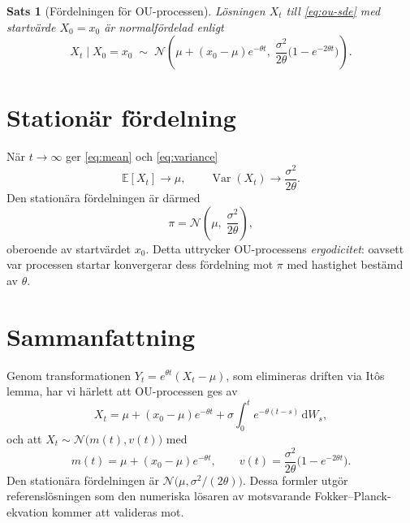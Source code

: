 \documentclass[11pt,a4paper]{article}
\newcommand{\E}{\mathbb{E}}
\newcommand{\Var}{\operatorname{Var}}
\newcommand{\dd}{\mathrm{d}}
\theoremstyle{plain}
\newtheorem{theorem}{Sats}
\theoremstyle{definition}
\theoremstyle{remark}
\begin{document}
\begin{theorem}[Fördelningen för OU-processen]
\label{thm:ou}
Lösningen $X_t$ till \eqref{eq:ou-sde} med startvärde $X_0 = x_0$ är normalfördelad enligt
\begin{equation}
    X_t \mid X_0 = x_0 \;\sim\; \mathcal{N}\!\left(\mu + (x_0 - \mu)e^{-\theta t},\; \frac{\sigma^2}{2\theta}\bigl(1 - e^{-2\theta t}\bigr)\right).
\end{equation}
\end{theorem}

\section{Stationär fördelning}

När $t \to \infty$ ger \eqref{eq:mean} och \eqref{eq:variance}
\[
    \E[X_t] \to \mu, \qquad \Var(X_t) \to \frac{\sigma^2}{2\theta}.
\]
Den stationära fördelningen är därmed
\begin{equation}
    \pi = \mathcal{N}\!\left(\mu,\; \frac{\sigma^2}{2\theta}\right),
    \label{eq:stationary}
\end{equation}
oberoende av startvärdet $x_0$. Detta uttrycker OU-processens \emph{ergodicitet}: oavsett var processen startar konvergerar dess fördelning mot $\pi$ med hastighet bestämd av $\theta$.

\section{Sammanfattning}

Genom transformationen $Y_t = e^{\theta t}(X_t - \mu)$, som elimineras driften via Itôs lemma, har vi härlett att OU-processen ges av
\[
    X_t = \mu + (x_0 - \mu)e^{-\theta t} + \sigma \int_0^t e^{-\theta(t-s)}\,\dd W_s,
\]
och att $X_t \sim \mathcal{N}\bigl(m(t), v(t)\bigr)$ med
\[
    m(t) = \mu + (x_0 - \mu)e^{-\theta t}, \qquad v(t) = \frac{\sigma^2}{2\theta}\bigl(1 - e^{-2\theta t}\bigr).
\]
Den stationära fördelningen är $\mathcal{N}\bigl(\mu, \sigma^2/(2\theta)\bigr)$. Dessa formler utgör referenslösningen som den numeriska lösaren av motsvarande Fokker--Planck-ekvation kommer att valideras mot.
\end{document}
